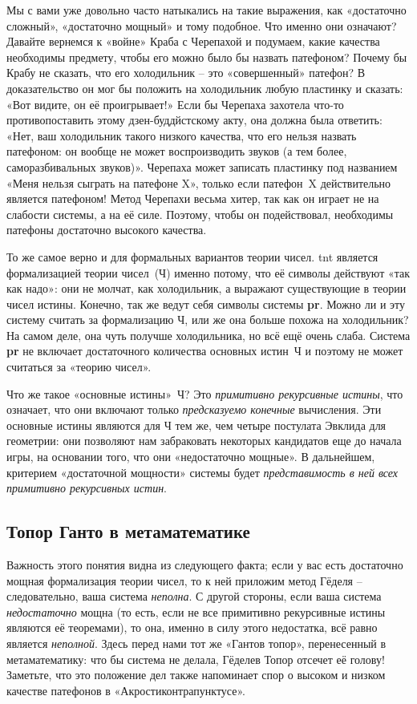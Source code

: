 \documentclass[../main.tex]{subfiles}
\begin{document}
Мы с вами уже довольно часто натыкались на такие выражения, как «достаточно сложный», «достаточно мощный» и тому подобное. Что именно они означают? Давайте вернемся к «войне» Краба с Черепахой и подумаем, какие качества необходимы предмету, чтобы его можно было бы назвать патефоном? Почему бы Крабу не сказать, что его холодильник \--- это «совершенный» патефон? В доказательство он мог бы положить на холодильник любую пластинку и сказать: «Вот видите, он её проигрывает!» Если бы Черепаха захотела что-то противопоставить этому дзен-буддйстскому акту, она должна была ответить: «Нет, ваш холодильник такого низкого качества, что его нельзя назвать патефоном: он вообще не может воспроизводить звуков (а тем более, саморазбивальных звуков)». Черепаха может записать пластинку под названием «Меня нельзя сыграть на патефоне X», только если патефон~X действительно является патефоном! Метод Черепахи весьма хитер, так как он играет не на слабости системы, а на её силе. Поэтому, чтобы он подействовал, необходимы патефоны достаточно высокого качества.

То же самое верно и для формальных вариантов теории чисел. \acs{tnt} является формализацией теории чисел~(Ч) именно потому, что её символы действуют «так как надо»: они не молчат, как холодильник, а выражают существующие в теории чисел истины. Конечно, так же ведут себя символы системы \textbf{pr}. Можно ли и эту систему считать за формализацию Ч, или же она больше похожа на холодильник? На самом деле, она чуть получше холодильника, но всё ещё очень слаба. Система \textbf{pr} не включает достаточного количества основных истин~Ч и поэтому не может считаться за «теорию чисел».

Что же такое «основные истины»~Ч? Это \emph{примитивно рекурсивные истины}, что означает, что они включают только \emph{предсказуемо конечные} вычисления. Эти основные истины являются для Ч тем же, чем четыре постулата Эвклида для геометрии: они позволяют нам забраковать некоторых кандидатов еще до начала игры, на основании того, что они «недостаточно мощные». В дальнейшем, критерием «достаточной мощности» системы будет \emph{представимость в ней всех примитивно рекурсивных истин}.


\subsection{Топор Ганто в метаматематике}

Важность этого понятия видна из следующего факта; если у вас есть достаточно мощная формализация теории чисел, то к ней приложим метод Гёделя \--- следовательно, ваша система \emph{неполна}. С другой стороны, если ваша система \emph{недостаточно} мощна (то есть, если не все примитивно рекурсивные истины являются её теоремами), то она, именно в силу этого недостатка, всё равно является \emph{неполной}. Здесь перед нами тот же «Гантов топор», перенесенный в метаматематику: что бы система не делала, Гёделев Топор отсечет её голову! Заметьте, что это положение дел также напоминает спор о высоком и низком качестве патефонов в «Акростиконтрапунктусе».
\end{document}
